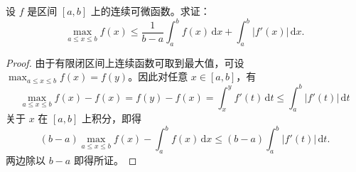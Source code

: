 \documentclass[../../main.tex]{subfiles}%
\begin{document}
\begin{example}
设 \( f \) 是区间 \([a,b]\) 上的连续可微函数。求证：
\[
\max_{a\leqslant x\leqslant b} f(x)\leqslant \frac{1}{b-a}\int_a^b{f(x)\,\mathrm{d}x}+\int_a^b{|f' (x)|\,\mathrm{d}x}.
\]
\end{example}
\begin{proof}

由于有限闭区间上连续函数可取到最大值，可设 \( \max_{a \leqslant x \leqslant b} f(x) = f(y) \)。因此对任意 \( x \in [a,b] \)，有
\[
\max_{a \leqslant x \leqslant b} f(x) - f(x) = f(y) - f(x) = \int_{x}^{y} f'(t) \, \mathrm{d}t \leqslant \int_{a}^{b} |f'(t)| \, \mathrm{d}t
\]
关于 \( x \) 在 \([a,b]\) 上积分，即得
\[
(b - a) \max_{a \leqslant x \leqslant b} f(x) - \int_{a}^{b} f(x) \, \mathrm{d}x \leqslant (b-a)\int_{a}^{b} |f'(t)| \, \mathrm{d}t.
\]
两边除以 \( b - a \) 即得所证。

\end{proof}
\end{document}
